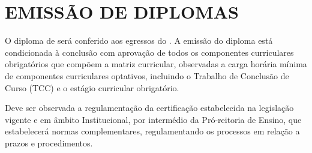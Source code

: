 \section{EMISSÃO DE DIPLOMAS}

O diploma de \NOMEEGRESSO será conferido aos egressos do \NOMECURSO . A emissão do diploma  está condicionada à conclusão com aprovação de todos os componentes curriculares obrigatórios que compõem a matriz curricular, observadas a carga horária mínima de componentes curriculares optativos, incluindo o Trabalho de Conclusão de Curso (TCC) e o estágio curricular obrigatório. 

Deve ser observada a regulamentação da certificação estabelecida na legislação vigente e em âmbito Institucional, por intermédio da Pró-reitoria de Ensino, que estabelecerá normas complementares, regulamentando os processos em relação a prazos e procedimentos.
